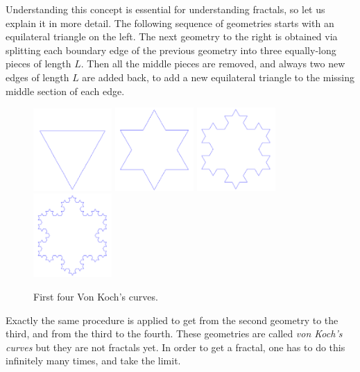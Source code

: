 \documentclass{article}
\begin{document}
Understanding this concept is essential for understanding fractals, so let us explain it in more 
detail. The following sequence of geometries starts with an equilateral triangle on the left.
The next geometry to the right is obtained via splitting each boundary edge of the previous 
geometry into three equally-long pieces of length $L$. Then all the middle pieces are removed, 
and always two new edges of length $L$ are added back, to add a new equilateral triangle to 
the missing middle section of each edge.\\[-6mm]

\begin{figure}[!ht]
\begin{center}
\includegraphics[width=3cm]{img/s1.png}
\includegraphics[width=3cm]{img/s2.png}
\includegraphics[width=3cm]{img/s3.png}
\includegraphics[width=3cm]{img/s4.png}
\end{center}
\caption{First four Von Koch's curves.}
\end{figure}

\noindent
Exactly the same procedure is applied to get from the second geometry to the third, and from the 
third to the fourth. These geometries are called {\em von Koch's curves} but they are not fractals 
yet. In order to get a fractal, one 
has to do this infinitely many times, and take the limit. \\
\end{document}
